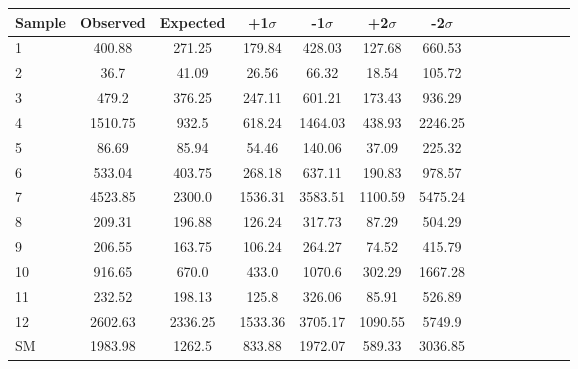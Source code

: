 \begin{table}[h]
\label{tab:2p1limcomb}
\begin{tabular}{|l|c|c|c|c|c|c|c|c|c|c|c|c|c|}
\hline
Sample & Observed & Expected & +1$\sigma$ & -1$\sigma$ & +2$\sigma$ & -2$\sigma$ \\ \hline
1 & 400.88 & 271.25 & 179.84 & 428.03 & 127.68 & 660.53\\
2 & 36.7 & 41.09 & 26.56 & 66.32 & 18.54 & 105.72\\
3 & 479.2 & 376.25 & 247.11 & 601.21 & 173.43 & 936.29\\
4 & 1510.75 & 932.5 & 618.24 & 1464.03 & 438.93 & 2246.25\\
5 & 86.69 & 85.94 & 54.46 & 140.06 & 37.09 & 225.32\\
6 & 533.04 & 403.75 & 268.18 & 637.11 & 190.83 & 978.57\\
7 & 4523.85 & 2300.0 & 1536.31 & 3583.51 & 1100.59 & 5475.24\\
8 & 209.31 & 196.88 & 126.24 & 317.73 & 87.29 & 504.29\\
9 & 206.55 & 163.75 & 106.24 & 264.27 & 74.52 & 415.79\\
10 & 916.65 & 670.0 & 433.0 & 1070.6 & 302.29 & 1667.28\\
11 & 232.52 & 198.13 & 125.8 & 326.06 & 85.91 & 526.89\\
12 & 2602.63 & 2336.25 & 1533.36 & 3705.17 & 1090.55 & 5749.9\\
SM & 1983.98 & 1262.5 & 833.88 & 1972.07 & 589.33 & 3036.85\\

\end{tabular}
\end{table}

